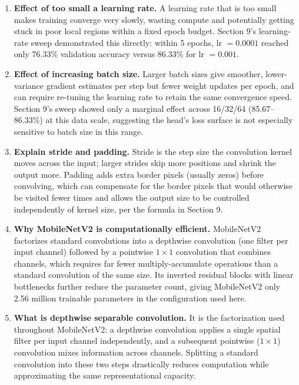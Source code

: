 \documentclass[10pt]{article}
\begin{document}
\begin{enumerate}
\item \textbf{Effect of too small a learning rate.}
A learning rate that is too small makes training converge very slowly,
wasting compute and potentially getting stuck in poor local regions within
a fixed epoch budget. Section 9's learning-rate sweep demonstrated this
directly: within 5 epochs, lr $=0.0001$ reached only 76.33\% validation
accuracy versus 86.33\% for lr $=0.001$.

\item \textbf{Effect of increasing batch size.}
Larger batch sizes give smoother, lower-variance gradient estimates per
step but fewer weight updates per epoch, and can require re-tuning the
learning rate to retain the same convergence speed. Section 9's sweep
showed only a marginal effect across 16/32/64 (85.67--86.33\%) at this data
scale, suggesting the head's loss surface is not especially sensitive to
batch size in this range.

\item \textbf{Explain stride and padding.}
Stride is the step size the convolution kernel moves across the input;
larger strides skip more positions and shrink the output more. Padding
adds extra border pixels (usually zeros) before convolving, which can
compensate for the border pixels that would otherwise be visited fewer
times and allows the output size to be controlled independently of kernel
size, per the formula in Section 9.

\item \textbf{Why MobileNetV2 is computationally efficient.}
MobileNetV2 factorizes standard convolutions into a depthwise convolution
(one filter per input channel) followed by a pointwise $1\times1$
convolution that combines channels, which requires far fewer
multiply-accumulate operations than a standard convolution of the same
size. Its inverted residual blocks with linear bottlenecks further reduce
the parameter count, giving MobileNetV2 only 2.56 million trainable
parameters in the configuration used here.

\item \textbf{What is depthwise separable convolution.}
It is the factorization used throughout MobileNetV2: a depthwise
convolution applies a single spatial filter per input channel
independently, and a subsequent pointwise ($1\times1$) convolution mixes
information across channels. Splitting a standard convolution into these
two steps drastically reduces computation while approximating the same
representational capacity.


\end{enumerate}
\end{document}
